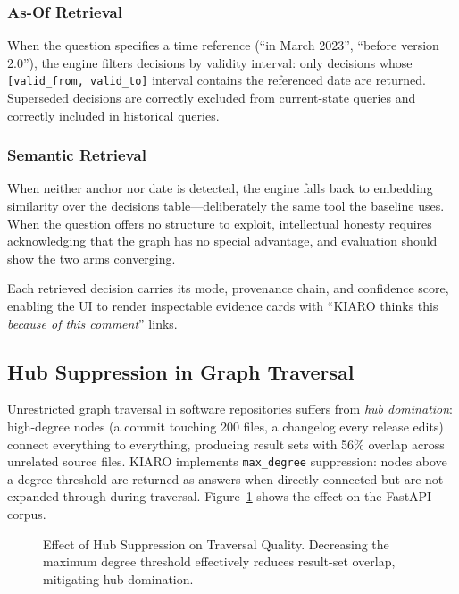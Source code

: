 \documentclass[conference]{IEEEtran}
\begin{document}
\subsubsection{As-Of Retrieval}
When the question specifies a time reference (``in March 2023'', ``before version 2.0''), the engine filters decisions by validity interval: only decisions whose \texttt{[valid\_from, valid\_to]} interval contains the referenced date are returned. Superseded decisions are correctly excluded from current-state queries and correctly included in historical queries.

\subsubsection{Semantic Retrieval}
When neither anchor nor date is detected, the engine falls back to embedding similarity over the decisions table---deliberately the same tool the baseline uses. When the question offers no structure to exploit, intellectual honesty requires acknowledging that the graph has no special advantage, and evaluation should show the two arms converging.

Each retrieved decision carries its mode, provenance chain, and confidence score, enabling the UI to render inspectable evidence cards with ``KIARO thinks this \emph{because of this comment}'' links.

\subsection{Hub Suppression in Graph Traversal}

Unrestricted graph traversal in software repositories suffers from \emph{hub domination}: high-degree nodes (a commit touching 200 files, a changelog every release edits) connect everything to everything, producing result sets with 56\% overlap across unrelated source files. KIARO implements \texttt{max\_degree} suppression: nodes above a degree threshold are returned as answers when directly connected but are not expanded through during traversal. Figure~\ref{fig:hub} shows the effect on the FastAPI corpus.

\begin{figure}[h]
\centering
{}
\caption{Effect of Hub Suppression on Traversal Quality. Decreasing the maximum degree threshold effectively reduces result-set overlap, mitigating hub domination.}
\label{fig:hub}
\end{figure}
\end{document}
